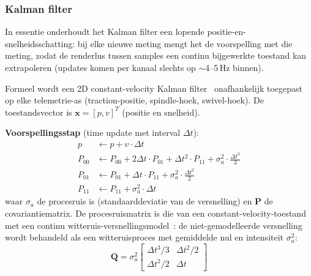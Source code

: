 \documentclass[10pt, a4paper, twocolumn]{article}
\begin{document}
\subsubsection{Kalman filter}
In essentie onderhoudt het Kalman filter een lopende positie-en-snelheidsschatting:
bij elke nieuwe meting mengt het de voorspelling met die meting, zodat de
renderlus tussen samples een continu bijgewerkte toestand kan extrapoleren
(updates komen per kanaal slechts op $\sim$4--5\,Hz binnen).

Formeel wordt een 2D constant-velocity Kalman
filter~\cite{kalman1960, welch1995kalman} onafhankelijk toegepast op elke
telemetrie-as (traction-positie, spindle-hoek, swivel-hoek). De toestandsvector
is $\mathbf{x} = [p, v]^T$ (positie en snelheid).

\textbf{Voorspellingsstap} (time update met interval $\Delta t$):
\begin{align}
\label{eq:kf-predict}
p &\leftarrow p + v \cdot \Delta t \nonumber\\
P_{00} &\leftarrow P_{00} + 2\Delta t \cdot P_{01} + \Delta t^2 \cdot P_{11} + \sigma_a^2 \cdot \tfrac{\Delta t^3}{3} \nonumber\\
P_{01} &\leftarrow P_{01} + \Delta t \cdot P_{11} + \sigma_a^2 \cdot \tfrac{\Delta t^2}{2} \\
P_{11} &\leftarrow P_{11} + \sigma_a^2 \cdot \Delta t \nonumber
\end{align}
waar $\sigma_a$ de procesruis is (standaarddeviatie van de versnelling) en
$\mathbf{P}$ de covariantiematrix. De procesruismatrix is die van een
constant-velocity-toestand met een continu witteruis-versnellingsmodel~\cite{labbe2015kalman, barshalom2001estimation}:
de niet-gemodelleerde versnelling wordt behandeld als een
witteruisproces met gemiddelde nul en intensiteit $\sigma_a^2$:
\begin{equation}
\label{eq:kf-Q}
\mathbf{Q} = \sigma_a^2 \begin{bmatrix} \Delta t^3/3 & \Delta t^2/2 \\ \Delta t^2/2 & \Delta t \end{bmatrix}
\end{equation}
\end{document}
